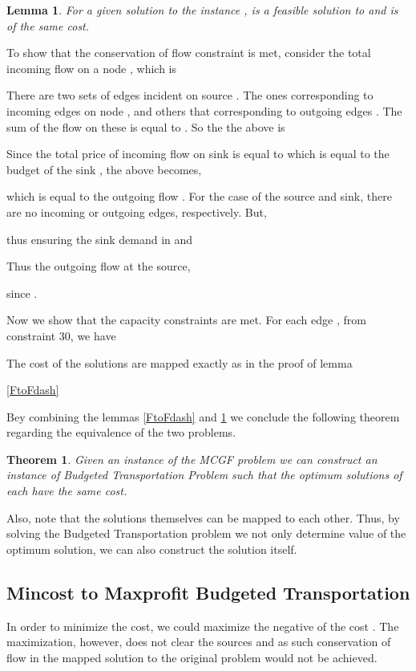 \documentclass[11pt]{article}
\newenvironment{proof}{\par\noindent{\bf Proof:}}{\mbox{}\hfill\\}
\newtheorem{theorem}{Theorem}[section]
\newtheorem{lemma}{Lemma}[section]
\newcounter{rem}
\begin{document}
\begin{lemma}
For a given solution  to the  instance ,  is a feasible solution to
 and is of the same cost.
\label{FdashtoF}
\end{lemma}

\begin{proof}
To show that the conservation of flow constraint is met, consider
the total incoming flow on a node , which is 



There are two sets of edges incident on source . The ones
corresponding to incoming edges on node ,  and
others that corresponding to outgoing edges . The sum
of  the flow  on these is equal to . So the the above is



Since the total price of incoming flow on sink  is equal to
 which is
equal to the budget of the sink , the above becomes,


which is equal to the outgoing flow .
For the case of the source and sink, there are no incoming or outgoing
edges, respectively. But,

thus ensuring the sink demand in  and

Thus the outgoing flow at the source,

since .
 

Now we show that the capacity constraints are met. For each edge 
, from constraint 30,  we have


The cost of the solutions are mapped exactly as in the proof of lemma 

\ref{FtoFdash}
\end{proof}

Bey combining the lemmas \ref{FtoFdash} and \ref{FdashtoF} we conclude
the following theorem regarding the equivalence of the two problems. 


\begin{theorem}
Given an instance of the MCGF problem  we can construct an instance
of Budgeted Transportation Problem such that the optimum solutions
of each have the same cost.
\end{theorem}

Also, note that the solutions themselves can be mapped to each other.
Thus, by solving the Budgeted Transportation problem we not only determine
value of the optimum solution, we can also construct the solution itself.
\vspace*{.2in}

\subsection{Mincost to Maxprofit Budgeted Transportation}
In order to minimize the cost, we could maximize the negative of the cost
. The maximization, however, does not clear the sources and as such 
conservation of flow in the mapped solution to the original problem would not 
be achieved.
\end{document}
